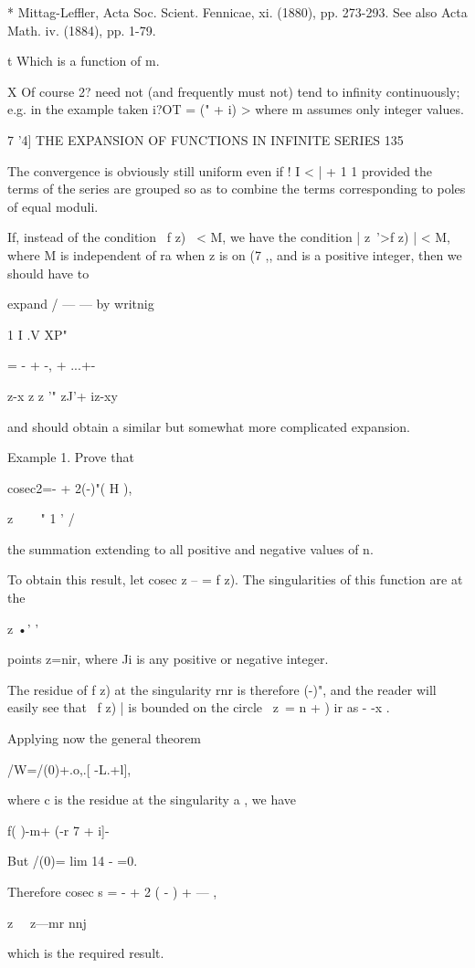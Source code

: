 * Mittag-Leffler, Acta Soc. Scient. Fennicae, xi. (1880), pp. 273-293.
See also Acta Math. iv. (1884), pp. 1-79.

t Which is a function of m.

X Of course 2? need not (and frequently must not) tend to infinity
continuously; e.g. in the example taken i?OT = (" + i) > where m
assumes only integer values.

7 '4] THE EXPANSION OF FUNCTIONS IN INFINITE SERIES 135

The convergence is obviously still uniform even if ! I < | + 1 1
provided the terms of the series are grouped so as to combine the
terms corresponding to poles of equal moduli.

If, instead of the condition \ f z) \ < M, we have the condition |
z~'>f z) | < M, where M is independent of ra when z is on (7 ,, and is
a positive integer, then we should have to

expand / — — by writnig

1 I .V XP"

= - + -, + ...+-

z-x z z '" zJ'+ iz-xy

and should obtain a similar but somewhat more complicated expansion.

Example 1. Prove that

cosec2=- + 2(-)"( H ),

z \ \ ~ " 1 ' /

the summation extending to all positive and negative values of n.

To obtain this result, let cosec z -- = f z). The singularities of
this function are at the

z •' '

points z=nir, where Ji is any positive or negative integer.

The residue of f z) at the singularity rnr is therefore (-)", and the
reader will easily see that \ f z) | is bounded on the circle \ z\ = n
+ ) ir as - -x .

Applying now the general theorem

/W=/(0)+.o,.[ -L.+l],

where c is the residue at the singularity a , we have

f( )-m+ (-r 7 + i]-

But /(0)= lim 14 - =0.

Therefore cosec s = - + 2 ( - ) + — ,

z \ \ z—mr nnj

which is the required result.

